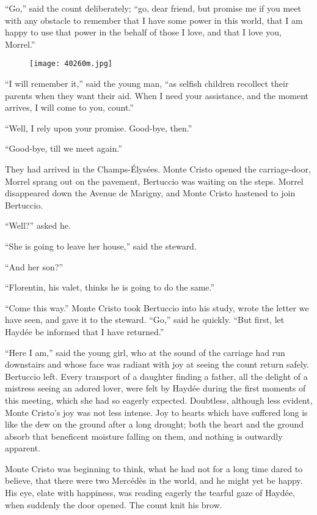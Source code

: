 “Go,” said the count deliberately; “go, dear friend, but promise me if
you meet with any obstacle to remember that I have some power in this
world, that I am happy to use that power in the behalf of those I love,
and that I love you, Morrel.”

\begin{figure}[ht]
\texttt{[image: 40260m.jpg]}
\end{figure}

“I will remember it,” said the young man, “as selfish children
recollect their parents when they want their aid. When I need your
assistance, and the moment arrives, I will come to you, count.”

“Well, I rely upon your promise. Good-bye, then.”

“Good-bye, till we meet again.”

They had arrived in the Champs-Élysées. Monte Cristo opened the
carriage-door, Morrel sprang out on the pavement, Bertuccio was waiting
on the steps. Morrel disappeared down the Avenue de Marigny, and Monte
Cristo hastened to join Bertuccio.

“Well?” asked he.

“She is going to leave her house,” said the steward.

“And her son?”

“Florentin, his valet, thinks he is going to do the same.”

“Come this way.” Monte Cristo took Bertuccio into his study, wrote the
letter we have seen, and gave it to the steward. “Go,” said he quickly.
“But first, let Haydée be informed that I have returned.”

“Here I am,” said the young girl, who at the sound of the carriage had
run downstairs and whose face was radiant with joy at seeing the count
return safely. Bertuccio left. Every transport of a daughter finding a
father, all the delight of a mistress seeing an adored lover, were felt
by Haydée during the first moments of this meeting, which she had so
eagerly expected. Doubtless, although less evident, Monte Cristo’s joy
was not less intense. Joy to hearts which have suffered long is like
the dew on the ground after a long drought; both the heart and the
ground absorb that beneficent moisture falling on them, and nothing is
outwardly apparent.

Monte Cristo was beginning to think, what he had not for a long time
dared to believe, that there were two Mercédès in the world, and he
might yet be happy. His eye, elate with happiness, was reading eagerly
the tearful gaze of Haydée, when suddenly the door opened. The count
knit his brow.

